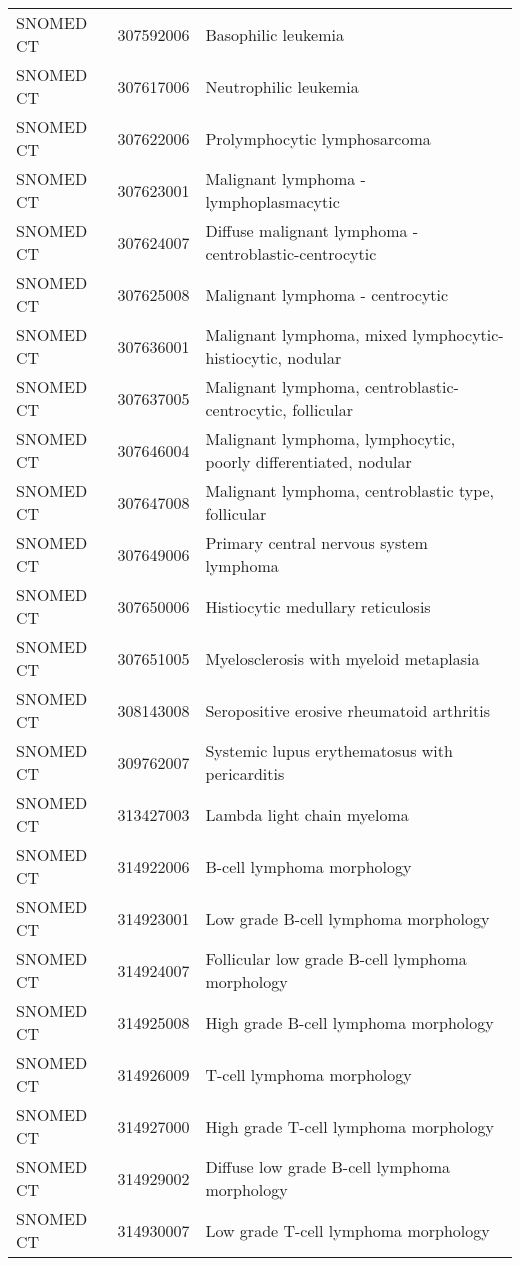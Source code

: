 \begin{table}[ht]
\begin{tabular}{lll}
  SNOMED CT & 307592006 & Basophilic leukemia \\ 
  SNOMED CT & 307617006 & Neutrophilic leukemia \\ 
  SNOMED CT & 307622006 & Prolymphocytic lymphosarcoma \\ 
  SNOMED CT & 307623001 & Malignant lymphoma - lymphoplasmacytic \\ 
  SNOMED CT & 307624007 & Diffuse malignant lymphoma - centroblastic-centrocytic \\ 
  SNOMED CT & 307625008 & Malignant lymphoma - centrocytic \\ 
  SNOMED CT & 307636001 & Malignant lymphoma, mixed lymphocytic-histiocytic, nodular \\ 
  SNOMED CT & 307637005 & Malignant lymphoma, centroblastic-centrocytic, follicular \\ 
  SNOMED CT & 307646004 & Malignant lymphoma, lymphocytic, poorly differentiated, nodular \\ 
  SNOMED CT & 307647008 & Malignant lymphoma, centroblastic type, follicular \\ 
  SNOMED CT & 307649006 & Primary central nervous system lymphoma \\ 
  SNOMED CT & 307650006 & Histiocytic medullary reticulosis \\ 
  SNOMED CT & 307651005 & Myelosclerosis with myeloid metaplasia \\ 
  SNOMED CT & 308143008 & Seropositive erosive rheumatoid arthritis \\ 
  SNOMED CT & 309762007 & Systemic lupus erythematosus with pericarditis \\ 
  SNOMED CT & 313427003 & Lambda light chain myeloma \\ 
  SNOMED CT & 314922006 & B-cell lymphoma morphology \\ 
  SNOMED CT & 314923001 & Low grade B-cell lymphoma morphology \\ 
  SNOMED CT & 314924007 & Follicular low grade B-cell lymphoma morphology \\ 
  SNOMED CT & 314925008 & High grade B-cell lymphoma morphology \\ 
  SNOMED CT & 314926009 & T-cell lymphoma morphology \\ 
  SNOMED CT & 314927000 & High grade T-cell lymphoma morphology \\ 
  SNOMED CT & 314929002 & Diffuse low grade B-cell lymphoma morphology \\ 
  SNOMED CT & 314930007 & Low grade T-cell lymphoma morphology \\ 

\end{tabular}
\end{table}
